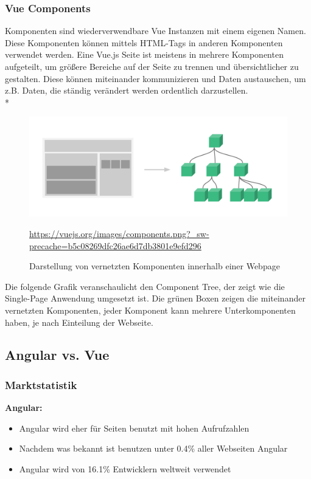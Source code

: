 \subsubsection{Vue Components}
Komponenten sind wiederverwendbare Vue Instanzen mit einem eigenen Namen. Diese Komponenten können mittels HTML-Tags in anderen Komponenten verwendet werden.
Eine Vue.js Seite ist meistens in mehrere Komponenten aufgeteilt, um größere Bereiche auf der Seite zu trennen und übersichtlicher zu gestalten. Diese können miteinander 
kommunizieren und Daten austauschen, um z.B. Daten, die ständig verändert werden ordentlich darzustellen.\cite{VueGuideComponents} \\*
\begin{figure}[htp]
    \centering
    \includegraphics[scale=0.3]{pics/NestedComponentsTree.png}
    \caption{Darstellung von vernetzten Komponenten innerhalb einer Webpage}
        \small \url{https://vuejs.org/images/components.png?_sw-precache=b5c08269dfc26ae6d7db3801e9efd296}
    \label{fig:impl:NestedComponentsTree}
\end{figure}
Die folgende Grafik veranschaulicht den Component Tree, der zeigt wie die Single-Page Anwendung umgesetzt ist. 
Die grünen Boxen zeigen die miteinander vernetzten Komponenten, jeder Komponent kann mehrere Unterkomponenten haben, je nach Einteilung der Webseite.
\subsection{Angular vs. Vue}
\subsubsection{Marktstatistik}
\textbf{Angular:}
\begin{itemize}
    \item Angular wird eher für Seiten benutzt mit hohen Aufrufzahlen
    \item Nachdem was bekannt ist benutzen unter 0.4\% aller Webseiten Angular    
    \item Angular wird von 16.1\% Entwicklern weltweit verwendet \cite{AngVsVueSIM}
\end{itemize}

